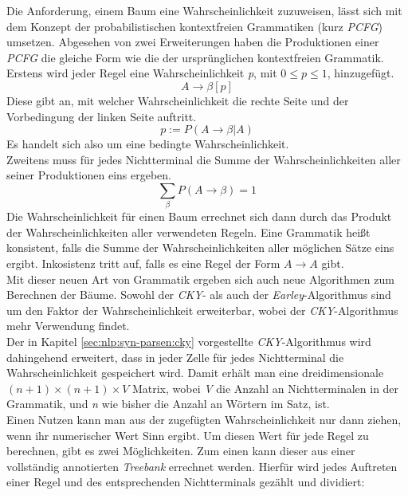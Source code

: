 Die Anforderung, einem Baum eine Wahrscheinlichkeit zuzuweisen, lässt sich mit dem Konzept der probabilistischen kontextfreien Grammatiken (kurz \textit{PCFG}) umsetzen. Abgesehen von zwei Erweiterungen haben die Produktionen einer \textit{PCFG} die gleiche Form wie die der ursprünglichen kontextfreien Grammatik. Erstens wird jeder Regel eine Wahrscheinlichkeit \textit{p}, mit \( 0 \leq p \leq 1 \), hinzugefügt.
\begin{equation}
A \to \beta  [p]
\end{equation}
Diese gibt an, mit welcher Wahrscheinlichkeit die rechte Seite und der Vorbedingung der linken Seite auftritt.
\begin{equation}
p := P(A \to \beta | A)
\end{equation}
Es handelt sich also um eine bedingte Wahrscheinlichkeit.\\ 
Zweitens muss für jedes Nichtterminal die Summe der Wahrscheinlichkeiten aller seiner Produktionen eins ergeben.
\begin{equation}
\sum_{\beta} P(A \to \beta) = 1
\end{equation}
Die Wahrscheinlichkeit für einen Baum errechnet sich dann durch das Produkt der Wahrscheinlichkeiten aller verwendeten Regeln. Eine Grammatik heißt konsistent, falls die Summe der Wahrscheinlichkeiten aller möglichen Sätze eins ergibt. Inkosistenz tritt auf, falls es eine Regel der Form \( A \to A \) gibt.\\
Mit dieser neuen Art von Grammatik ergeben sich auch neue Algorithmen zum Berechnen der Bäume. Sowohl der \textit{CKY}- als auch der \textit{Earley}-Algorithmus sind um den Faktor der Wahrscheinlichkeit erweiterbar, wobei der \textit{CKY}-Algorithmus mehr Verwendung findet.\\
Der in Kapitel \ref{sec:nlp:syn-parsen:cky} vorgestellte \textit{CKY}-Algorithmus wird dahingehend erweitert, dass in jeder Zelle für jedes Nichtterminal die Wahrscheinlichkeit gespeichert wird. Damit erhält man eine dreidimensionale \( (n+1) \times (n+1) \times V\) Matrix, wobei \textit{V} die Anzahl an Nichtterminalen in der Grammatik, und \textit{n} wie bisher die Anzahl an Wörtern im Satz, ist. \\
Einen Nutzen kann man aus der zugefügten Wahrscheinlichkeit nur dann ziehen, wenn ihr numerischer Wert Sinn ergibt. Um diesen Wert für jede Regel zu berechnen, gibt es zwei Möglichkeiten. Zum einen kann dieser aus einer vollständig annotierten \textit{Treebank} errechnet werden. Hierfür wird jedes Auftreten einer Regel und des entsprechenden Nichtterminals gezählt und dividiert: 
